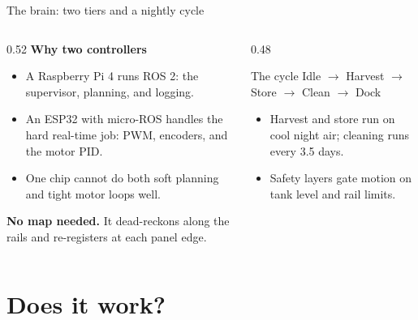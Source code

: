 \documentclass[aspectratio=169,10pt]{beamer}
\begin{document}
\begin{frame}{The brain: two tiers and a nightly cycle}
  \begin{columns}[T]
    \begin{column}{0.52\textwidth}
      \textbf{Why two controllers}
      \begin{itemize}\small\setlength\itemsep{0.3em}
        \item A Raspberry Pi 4 runs ROS 2: the supervisor, planning, and logging.
        \item An ESP32 with micro-ROS handles the hard real-time job: PWM, encoders, and the motor PID.
        \item One chip cannot do both soft planning and tight motor loops well.
      \end{itemize}
      \vspace{0.3em}
      \textbf{No map needed.} It dead-reckons along the rails and re-registers at each panel edge.
    \end{column}
    \begin{column}{0.48\textwidth}
      \begin{block}{The cycle}
        \centering
        Idle $\rightarrow$ Harvest $\rightarrow$ Store $\rightarrow$ Clean $\rightarrow$ Dock
      \end{block}
      \begin{itemize}\small\setlength\itemsep{0.3em}
        \item Harvest and store run on cool night air; cleaning runs every 3.5 days.
        \item Safety layers gate motion on tank level and rail limits.
      \end{itemize}
    \end{column}
  \end{columns}
\end{frame}

\section{Does it work?}
\end{document}
